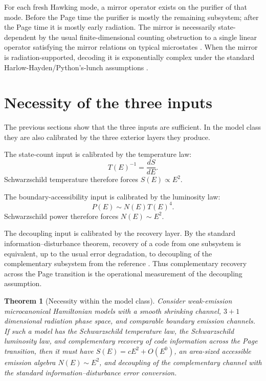\documentclass[12pt]{article}
\newtheorem{theorem}{Theorem}
\newcommand{\be}{\begin{equation}}
\newcommand{\ee}{\end{equation}}
\begin{document}
For each fresh Hawking mode, a mirror operator exists on the purifier of that
mode.  Before the Page time the purifier is mostly the remaining subsystem;
after the Page time it is mostly early radiation.  The mirror is necessarily
state-dependent by the usual finite-dimensional counting obstruction to a
single linear operator satisfying the mirror relations on typical microstates
\cite{PapadodimasRaju2013,PapadodimasRaju2014}.
When the mirror is radiation-supported, decoding it is exponentially complex
under the standard Harlow-Hayden/Python's-lunch assumptions
\cite{HarlowHayden2013,BrownGharibyanPeningtonSusskind2020}.

\section{Necessity of the three inputs}

The previous sections show that the three inputs are sufficient.  In the model
class they are also calibrated by the three exterior layers they produce.

The state-count input is calibrated by the temperature law:
\be
  T(E)^{-1}=\frac{dS}{dE}.
\ee
Schwarzschild temperature therefore forces $S(E)\propto E^2$.

The boundary-accessibility input is calibrated by the luminosity law:
\be
  P(E)\sim N(E)T(E)^4.
\ee
Schwarzschild power therefore forces $N(E)\sim E^2$.

The decoupling input is calibrated by the recovery layer.  By the standard
information--disturbance theorem, recovery of a code from one subsystem is
equivalent, up to the usual error degradation, to decoupling of the
complementary subsystem from the reference
\cite{Schumacher1996,KretschmannSchlingemannWerner2008}.  Thus complementary
recovery across the Page transition is the operational measurement of the
decoupling assumption.

\begin{theorem}[Necessity within the model class]
Consider weak-emission microcanonical Hamiltonian models with a smooth
shrinking channel, $3+1$ dimensional radiation phase space, and comparable
boundary emission channels.  If such a model has the Schwarzschild temperature
law, the Schwarzschild luminosity law, and complementary recovery of code
information across the Page transition, then it must have
$S(E)=cE^2+O(E^0)$, an area-sized accessible emission algebra
$N(E)\sim E^2$, and decoupling of the complementary channel with the standard
information--disturbance error conversion.
\end{theorem}
\end{document}
